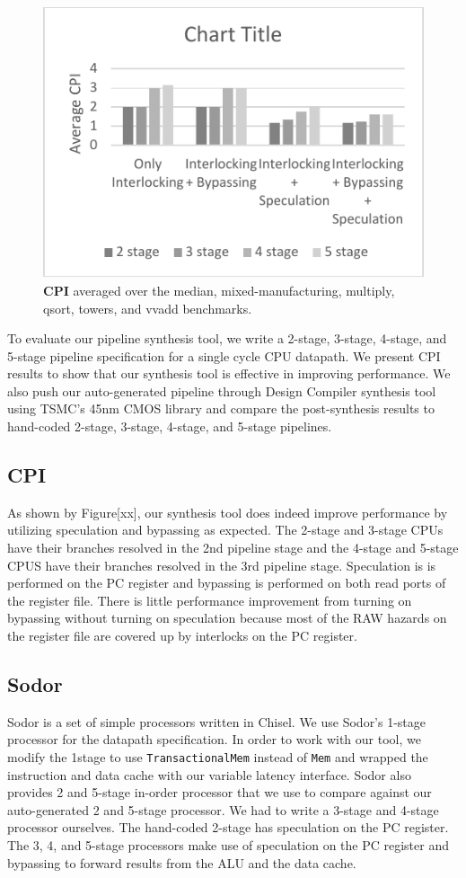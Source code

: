 \begin{figure}[htb]
\centering
\includegraphics{figures/cpi.pdf}
\caption{{\bf CPI} averaged over the median, mixed-manufacturing, multiply, qsort, towers, and vvadd benchmarks.}
\label{fig:CPI}
\end{figure}

To evaluate our pipeline synthesis tool, we write a 2-stage, 3-stage,
4-stage, and 5-stage pipeline specification for a single cycle CPU
datapath. We present CPI results to show that our synthesis tool is
effective in improving performance. We also push our auto-generated
pipeline through Design Compiler synthesis tool using TSMC's 45nm CMOS
library and compare the post-synthesis results to hand-coded 2-stage,
3-stage, 4-stage, and 5-stage pipelines.
\subsection{CPI}
As shown by Figure[xx], our synthesis tool does indeed improve performance by utilizing speculation and bypassing as expected. The 2-stage and 3-stage CPUs have their branches resolved in the 2nd pipeline stage and the 4-stage and 5-stage CPUS have their branches resolved in the 3rd pipeline stage. Speculation is is performed on the PC register and bypassing is performed on both read ports of the register file. There is little performance improvement from turning on bypassing without turning on speculation because most of the RAW hazards on the register file are covered up by interlocks on the PC register.
\subsection{Sodor}
Sodor is a set of simple processors written in Chisel. We use Sodor's
1-stage processor for the datapath specification. In order to work
with our tool, we modify the 1stage to use {\tt TransactionalMem}
instead of {\tt Mem} and wrapped the instruction and data cache with
our variable latency interface. Sodor also provides 2 and 5-stage
in-order processor that we use to compare against our auto-generated 2
and 5-stage processor. We had to write a 3-stage and 4-stage processor
ourselves. The hand-coded 2-stage has speculation on the PC
register. The 3, 4, and 5-stage processors make use of speculation on
the PC register and bypassing to forward results from the ALU and the
data cache.

